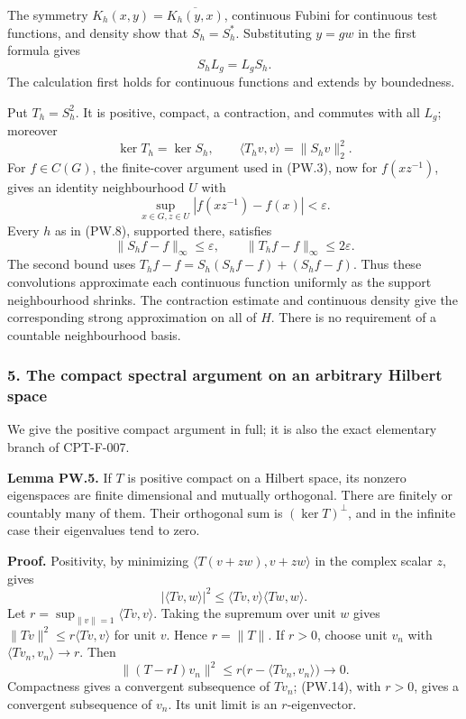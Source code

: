 \documentclass[
  11pt,
]{article}
\begin{document}
The symmetry \(K_h(x,y)=\overline{K_h(y,x)}\), continuous Fubini for
continuous test functions, and density show that \(S_h=S_h^*\).
Substituting \(y=gw\) in the first formula gives \[
S_hL_g=L_gS_h.
\tag{PW.11}
\] The calculation first holds for continuous functions and extends by
boundedness.

Put \(T_h=S_h^2\). It is positive, compact, a contraction, and commutes
with all \(L_g\); moreover \[
\ker T_h=\ker S_h,\qquad
\langle T_hv,v\rangle=\|S_hv\|_2^2.
\tag{PW.12}
\] For \(f\in C(G)\), the finite-cover argument used in (PW.3), now for
\(f(xz^{-1})\), gives an identity neighbourhood \(U\) with \[
\sup_{x\in G,z\in U}|f(xz^{-1})-f(x)|<\varepsilon.
\] Every \(h\) as in (PW.8), supported there, satisfies \[
\|S_hf-f\|_\infty\leq\varepsilon,\qquad
\|T_hf-f\|_\infty\leq2\varepsilon.
\tag{PW.13}
\] The second bound uses \(T_hf-f=S_h(S_hf-f)+(S_hf-f)\). Thus these
convolutions approximate each continuous function uniformly as the
support neighbourhood shrinks. The contraction estimate and continuous
density give the corresponding strong approximation on all of \(H\).
There is no requirement of a countable neighbourhood basis.

\subsubsection{5. The compact spectral argument on an arbitrary Hilbert
space}\label{the-compact-spectral-argument-on-an-arbitrary-hilbert-space}

We give the positive compact argument in full; it is also the exact
elementary branch of CPT-F-007.

\textbf{Lemma PW.5.} If \(T\) is positive compact on a Hilbert space,
its nonzero eigenspaces are finite dimensional and mutually orthogonal.
There are finitely or countably many of them. Their orthogonal sum is
\((\ker T)^\perp\), and in the infinite case their eigenvalues tend to
zero.

\textbf{Proof.} Positivity, by minimizing
\(\langle T(v+zw),v+zw\rangle\) in the complex scalar \(z\), gives \[
|\langle Tv,w\rangle|^2
\leq\langle Tv,v\rangle\langle Tw,w\rangle.
\] Let \(r=\sup_{\|v\|=1}\langle Tv,v\rangle\). Taking the supremum over
unit \(w\) gives \(\|Tv\|^2\leq r\langle Tv,v\rangle\) for unit \(v\).
Hence \(r=\|T\|\). If \(r>0\), choose unit \(v_n\) with
\(\langle Tv_n,v_n\rangle\to r\). Then \[
\|(T-rI)v_n\|^2
\leq r\bigl(r-\langle Tv_n,v_n\rangle\bigr)\longrightarrow0.
\tag{PW.14}
\] Compactness gives a convergent subsequence of \(Tv_n\); (PW.14), with
\(r>0\), gives a convergent subsequence of \(v_n\). Its unit limit is an
\(r\)-eigenvector.
\end{document}
